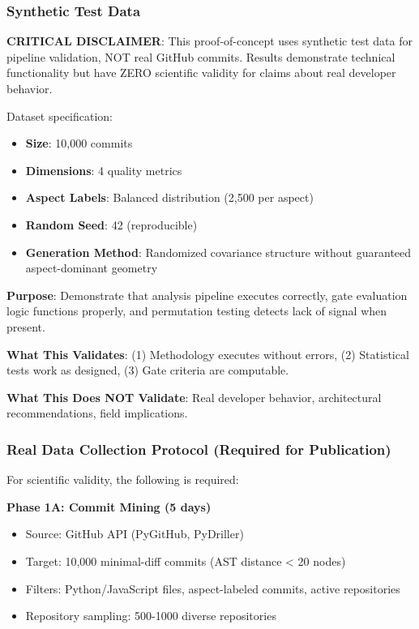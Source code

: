 
\subsubsection{Synthetic Test Data}

\textbf{CRITICAL DISCLAIMER}: This proof-of-concept uses synthetic test data for pipeline validation, NOT real GitHub commits. Results demonstrate technical functionality but have ZERO scientific validity for claims about real developer behavior.

Dataset specification:
\begin{itemize}
\item \textbf{Size}: 10,000 commits
\item \textbf{Dimensions}: 4 quality metrics
\item \textbf{Aspect Labels}: Balanced distribution (2,500 per aspect)
\item \textbf{Random Seed}: 42 (reproducible)
\item \textbf{Generation Method}: Randomized covariance structure without guaranteed aspect-dominant geometry
\end{itemize}

\textbf{Purpose}: Demonstrate that analysis pipeline executes correctly, gate evaluation logic functions properly, and permutation testing detects lack of signal when present.

\textbf{What This Validates}: (1) Methodology executes without errors, (2) Statistical tests work as designed, (3) Gate criteria are computable.

\textbf{What This Does NOT Validate}: Real developer behavior, architectural recommendations, field implications.

\subsubsection{Real Data Collection Protocol (Required for Publication)}

For scientific validity, the following is required:

\textbf{Phase 1A: Commit Mining (5 days)}
\begin{itemize}
\item Source: GitHub API (PyGitHub, PyDriller)
\item Target: 10,000 minimal-diff commits (AST distance < 20 nodes)
\item Filters: Python/JavaScript files, aspect-labeled commits, active repositories
\item Repository sampling: 500-1000 diverse repositories
\end{itemize}

